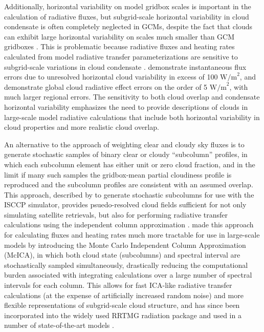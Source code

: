 Additionally, horizontal variability on model gridbox scales is
important in the calculation of radiative fluxes, but subgrid-scale
horizontal variability in cloud condensate is often completely neglected
in GCMs, despite the fact that clouds can exhibit large horizontal
variability on scales much smaller than GCM gridboxes
\citep[e.g.;][]{stephens_and_platt_1987}. This is problematic because
radiative fluxes and heating rates calculated from model radiative
transfer parameterizations are sensitive to subgrid-scale variations in
cloud condensate
\citep[e.g.,][]{barker_et_al_1999, wu_and_liang_2005, oreopoulos_et_al_2012}.
\citet{barker_et_al_1999} demonstrate instantaneous flux errors due to
unresolved horizontal cloud variability in excess of 100
\(\textrm{W/m}^2\), and \citet{oreopoulos_et_al_2012} demonstrate global
cloud radiative effect errors on the order of 5 \(\textrm{W/m}^2\), with
much larger regional errors. The sensitivity to both cloud overlap and
condensate horizontal variability emphasizes the need to provide
descriptions of clouds in large-scale model radiative calculations that
include both horizontal variability in cloud properties and more
realistic cloud overlap.

An alternative to the approach of weighting clear and cloudy sky fluxes
is to generate stochastic samples of binary clear or cloudy
``subcolumn'' profiles, in which each subcolumn element has either unit
or zero cloud fraction, and in the limit if many such samples the
gridbox-mean partial cloudiness profile is reproduced and the subcolumn
profiles are consistent with an assumed overlap. This approach,
described by \citet{klein_and_jakob_1999} to generate stochastic
subcolumns for use with the ISCCP simulator, provides psuedo-resolved
cloud fields sufficient for not only simulating satellite retrievals,
but also for performing radiative transfer calculations using the
independent column approximation \citep[ICA;][]{cahalan_et_al_1994}.
\citet{pincus_et_al_2003} made this approach for calculating fluxes and
heating rates much more tractable for use in large-scale models by
introducing the Monte Carlo Independent Column Approximation (McICA), in
which both cloud state (subcolumns) and spectral interval are
stochastically sampled simultaneously, drastically reducing the
computational burden associated with integrating calculations over a
large number of spectral intervals for each column. This allows for fast
ICA-like radiative transfer calculations (at the expense of artificially
increased random noise) and more flexible representations of
subgrid-scale cloud structure, and has since been incorporated into the
widely used RRTMG radiation package and used in a number of
state-of-the-art models
\citep{iacono_et_al_2008, von_salzen_et_al_2012, neale_et_al_2010a, neale_et_al_2010b, donner_et_al_2011, hogan_et_al_2014}.

